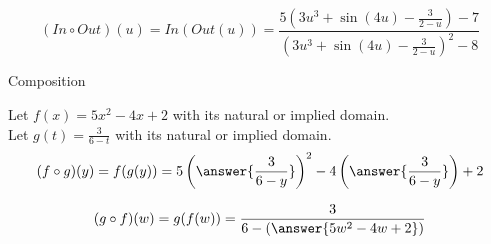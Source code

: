 \documentclass{ximera}
\begin{document}
\[
(In \circ Out)(u) = In(Out(u)) = \frac{5 \left( 3u^3 + \sin(4u) - \frac{3}{2-u} \right)-7}{\left( 3u^3 + \sin(4u) - \frac{3}{2-u} \right)^2-8}
\]





\begin{example} Composition 



Let $f(x) = 5x^2 - 4x + 2$ with its natural or implied domain. \\
Let $g(t) = \frac{3}{6-t}$ with its natural or implied domain. \\



\[
(f \circ g)(y) = f(g(y)) = 5 \left( \answer{\frac{3}{6-y}} \right)^2 - 4 \left( \answer{\frac{3}{6-y}} \right) + 2
\]





\[
(g \circ f)(w) = g(f(w)) = \frac{3}{6 - \left( \answer{5w^2 - 4w + 2} \right)}
\]



\end{example}
\end{document}
